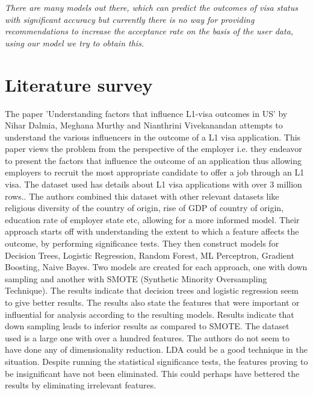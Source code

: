 \documentclass[conference]{IEEEtran}
\begin{document}
\textit{There are many models out there, which can predict the outcomes of visa status with significant accuracy but currently there is no way for providing recommendations to increase the acceptance rate on the basis of the user data, using our model we try to obtain this.}


\section{Literature survey}

The paper 'Understanding factors that influence L1-visa outcomes in US' by Nihar Dalmia, Meghana Murthy and Nianthrini Vivekanandan attempts to understand the various influencers in the outcome of a L1 visa application. This paper views the problem from the perspective of the employer i.e. they endeavor to present the factors that influence the outcome of an application thus allowing employers to recruit the most appropriate candidate to offer a job through an L1 visa. The dataset used has details about L1 visa applications with over 3 million rows.. The authors combined this dataset with other relevant datasets like religious diversity of the country of origin, rise of GDP of country of origin, education rate of employer state etc, allowing for a more informed model. Their approach starts off with understanding the extent to which a feature affects the outcome, by performing significance tests. They then construct models for Decision Trees, Logistic Regression, Random Forest, ML Perceptron, Gradient Boosting, Naive Bayes. Two models are created for each approach, one with down sampling and another with SMOTE (Synthetic Minority Oversampling Technique). The results indicate that decision trees and logistic regression seem to give better results. The results also state the features that were important or influential for analysis according to the resulting models. Results indicate that down sampling leads to inferior results as compared to SMOTE. The dataset used is a large one with over a hundred features. The authors do not seem to have done any of dimensionality reduction. LDA could be a good technique in the situation. Despite running the statistical significance tests, the features proving to be insignificant have not been eliminated. This could perhaps have bettered the results by eliminating irrelevant features.
\end{document}
